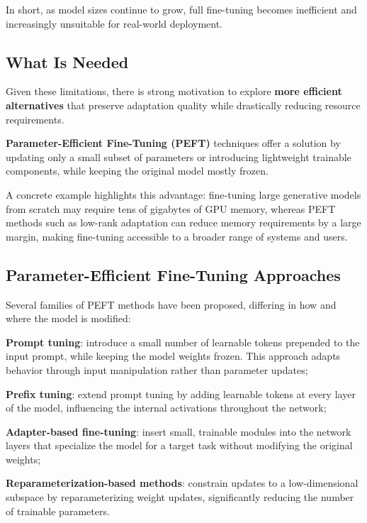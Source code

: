 In short, as model sizes continue to grow, full fine-tuning becomes inefficient and increasingly
unsuitable for real-world deployment.

\subsection{What Is Needed}
Given these limitations, there is strong motivation to explore \textbf{more efficient
alternatives} that preserve adaptation quality while drastically reducing resource
requirements.

\textbf{Parameter-Efficient Fine-Tuning (PEFT)} techniques offer a solution by updating only a
small subset of parameters or introducing lightweight trainable components, while keeping the
original model mostly frozen.

A concrete example highlights this advantage: fine-tuning large generative models from scratch
may require tens of gigabytes of GPU memory, whereas PEFT methods such as low-rank adaptation can
reduce memory requirements by a large margin, making fine-tuning accessible to a broader range
of systems and users.

\subsection{Parameter-Efficient Fine-Tuning Approaches}
Several families of PEFT methods have been proposed, differing in how and where the model is
modified:

\begin{compactitemize}
    \item \textbf{Prompt tuning}: introduce a small number of learnable tokens prepended to the
    input prompt, while keeping the model weights frozen. This approach adapts behavior through
    input manipulation rather than parameter updates;
    \item \textbf{Prefix tuning}: extend prompt tuning by adding learnable tokens at every layer
    of the model, influencing the internal activations throughout the network;
    \item \textbf{Adapter-based fine-tuning}: insert small, trainable modules into the network
    layers that specialize the model for a target task without modifying the original weights;
    \item \textbf{Reparameterization-based methods}: constrain updates to a low-dimensional
    subspace by reparameterizing weight updates, significantly reducing the number of trainable
    parameters.
\end{compactitemize}

